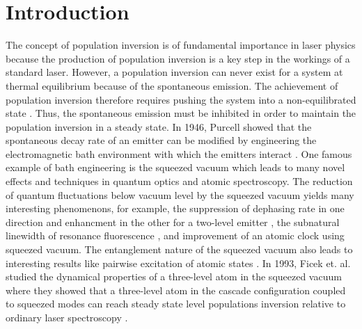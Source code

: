 \documentclass[aps,showpacs,twocolumn,twoside,groupedaddress]{revtex4}
\begin{document}
\section{Introduction}
The concept of population inversion is of fundamental importance in laser physics because the production of population inversion is a key step in the workings of a standard laser. However, a population inversion can never exist for a system at thermal equilibrium because of the spontaneous emission. The achievement of population inversion therefore requires pushing the system into a non-equilibrated state \cite{svelto1998principles}. Thus, the spontaneous emission must be inhibited in order to maintain the population inversion in a steady state. In 1946, Purcell showed that the spontaneous decay rate of an emitter can be modified by engineering the electromagnetic bath environment with which the emitters interact \cite{purcell1946purcell}. One famous example of bath engineering is the squeezed vacuum which leads to many novel effects and techniques in quantum optics and atomic spectroscopy. The reduction of quantum fluctuations below vacuum level by the squeezed vacuum yields many interesting phenomenons, for example, the suppression of dephasing rate in one direction and enhancment in the other for a two-level emitter \cite{gardiner1986cw, collett1984mj,gea1988vacuum,palma1989gm, agarwal1990cooperative, ficek1990spontaneous,ficek1991z, goldstein1996ev}, the subnatural linewidth of resonance fluorescence \cite{carmichael1987, toyli2016resonance}, and improvement of an atomic clock using squeezed vacuum\cite{Kruse}. The entanglement nature of the squeezed vacuum also leads to interesting results like pairwise excitation of atomic states \cite{tanas2004stationary, li2006preparing, You2018}. In 1993, Ficek et. al. studied the dynamical properties of a three-level atom in the squeezed vacuum where they showed that a three-level atom in the cascade configuration coupled to squeezed modes can reach steady state level populations inversion relative to ordinary laser spectroscopy \cite{ficek1991three, ficek1993two}. 
\end{document}
